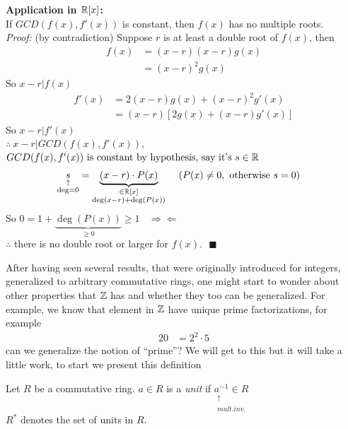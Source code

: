 \begin{example}
\textbf{Application in ${\mathbb{ R}}[x]$:} \\
If $GCD(f(x),f'(x))$ is constant, then $f(x)$ has no multiple roots. \\ \steezybreak
\textit{Proof:} (by contradiction)
Suppose $r$ is at least a double root of $f(x)$, then
\begin{align}
    f(x)&= (x-r)(x-r)g(x) \nonumber \\
    &= (x-r)^2 g(x) \nonumber
\end{align}
So $x-r|f(x)$
\begin{align}
    f'(x)&=2(x-r)g(x)+(x-r)^2 g'(x) \nonumber \\
    &= (x-r)[2g(x)+(x-r)g'(x)] \nonumber
\end{align}
So $x-r|f'(x)$ \\
$ \therefore \ x-r| GCD(f(x),f'(x)), $ \\
$GCD(f(x),f'(x))\text{ is constant by hypothesis, say it's }s\in {\mathbb{ R}}$
\begin{align}
    \underset{\substack{\uparrow \\ \deg=0}}{s}&= \underbrace{(x-r)\cdot P(x)}_{\substack{\in {\mathbb{ R}}[x] \\ \deg(x-r)+\deg(P(x))}} \ \ \ \ (P(x)\neq 0, \text{ otherwise } s=0) \nonumber
\end{align}
So $0= 1+ \underbrace{\deg(P(x))}_{\geq 0} \geq 1 \ \ \ \ \Rightarrow \Leftarrow$ \\
$\therefore$ there is no double root or larger for $f(x). \ \ \ \blacksquare$

\end{example}

After having seen several results, that were originally introduced for integers, generalized to arbitrary commutative rings, one might start to wonder about other properties that ${\mathbb{ Z}}$ has and whether they too can be generalized.
For example, we know that element in ${\mathbb{ Z}}$ have unique prime factorizations, for example
\begin{align}
    20&= 2^2\cdot 5 \nonumber
\end{align}
can we generalize the notion of ``prime''? We will get to this but it will take a little work, to start we present this definition
\begin{definition}
    Let $R$ be a commutative ring. $a\in R$ is a \textit{unit} if $\underset{\substack{\uparrow \ \ \ \ \ \  \ \\ mult. inv.}}{a^{-1}\in R}$ \\ \steezybreak
    $R^*$ denotes the set of units in $R$.
\end{definition}

